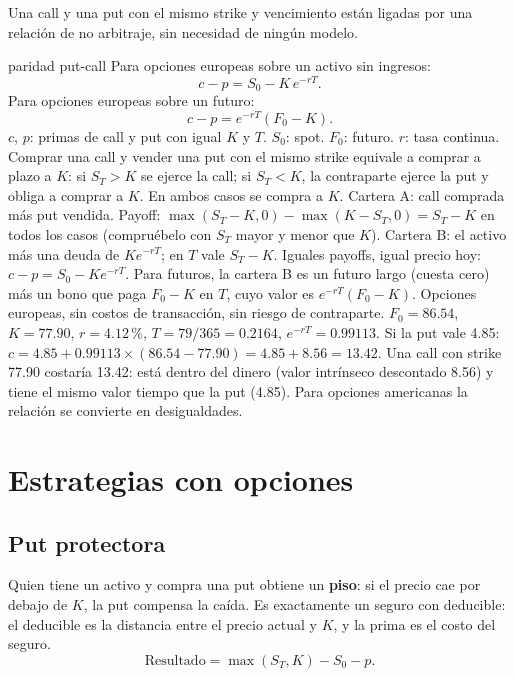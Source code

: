 Una call y una put con el mismo strike y vencimiento están ligadas por una relación de no arbitraje, sin necesidad de ningún modelo.

\begin{ficha}{paridad put-call}
 Para opciones europeas sobre un activo sin ingresos:
\[ c-p=S_0-K\,e^{-rT}. \]
Para opciones europeas sobre un futuro:
\[ c-p=e^{-rT}(F_0-K). \]
 $c$, $p$: primas de call y put con igual $K$ y $T$. $S_0$: spot. $F_0$: futuro. $r$: tasa continua.
 Comprar una call y vender una put con el mismo strike equivale a comprar a plazo a $K$: si $S_T>K$ se ejerce la call; si $S_T<K$, la contraparte ejerce la put y obliga a comprar a $K$. En ambos casos se compra a $K$.
 Cartera A: call comprada más put vendida. Payoff: $\max(S_T-K,0)-\max(K-S_T,0)=S_T-K$ en todos los casos (compruébelo con $S_T$ mayor y menor que $K$). Cartera B: el activo más una deuda de $Ke^{-rT}$; en $T$ vale $S_T-K$. Iguales payoffs, igual precio hoy: $c-p=S_0-Ke^{-rT}$. Para futuros, la cartera B es un futuro largo (cuesta cero) más un bono que paga $F_0-K$ en $T$, cuyo valor es $e^{-rT}(F_0-K)$.
 Opciones europeas, sin costos de transacción, sin riesgo de contraparte.
 $F_0=86.54$, $K=77.90$, $r=4.12\,\%$, $T=79/365=0.2164$, $e^{-rT}=0.99113$. Si la put vale 4.85: $c=4.85+0.99113\times(86.54-77.90)=4.85+8.56=13.42$.
 Una call con strike 77.90 costaría 13.42: está dentro del dinero (valor intrínseco descontado 8.56) y tiene el mismo valor tiempo que la put (4.85).
 Para opciones americanas la relación se convierte en desigualdades.
\end{ficha}

\section{Estrategias con opciones}

\subsection{Put protectora}

Quien tiene un activo y compra una put obtiene un \textbf{piso}: si el precio cae por debajo de $K$, la put compensa la caída. Es exactamente un seguro con deducible: el deducible es la distancia entre el precio actual y $K$, y la prima es el costo del seguro.
\[ \text{Resultado}=\max(S_T,K)-S_0-p. \]

